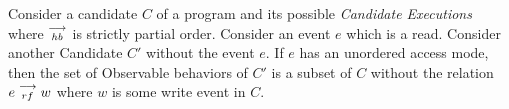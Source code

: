 \begin{theorem}
    Consider a candidate $C$ of a program and its possible \textit{Candidate Executions} where $\stackrel{\longrightarrow}{_\textit{hb}}$ is strictly partial order. Consider an event $e$ which is a read. Consider another Candidate $C'$ without the event $e$. If $e$ has an unordered access mode, then the set of Observable behaviors of $C'$ is a subset of $C$ without the relation $e\stackrel{\longrightarrow}{_{rf}}w$ where $w$ is some write event in $C$.   
\end{theorem}